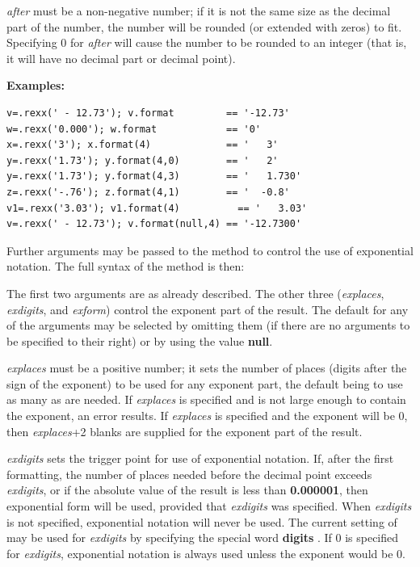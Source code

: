 \emph{after} must be a non-negative number; if it is not the same
size as the decimal part of the number, the number will be rounded (or
extended with zeros) to fit.  Specifying 0 for \emph{after} will
cause the number to be rounded to an integer (that is, it will have no
decimal part or decimal point).
 
\textbf{Examples:}
\begin{lstlisting}
v=.rexx(' - 12.73'); v.format         == '-12.73'
w=.rexx('0.000'); w.format            == '0'
x=.rexx('3'); x.format(4)             == '   3'
y=.rexx('1.73'); y.format(4,0)        == '   2'
y=.rexx('1.73'); y.format(4,3)        == '   1.730'
z=.rexx('-.76'); z.format(4,1)        == '  -0.8'
v1=.rexx('3.03'); v1.format(4)          == '   3.03'
v=.rexx(' - 12.73'); v.format(null,4) == '-12.7300'
\end{lstlisting}
 
Further arguments may be passed to the  method to control
the use of exponential notation.
The full syntax of the method is then:
 
 The first two arguments are as already described.  The other three
(\emph{explaces}, \emph{exdigits}, and \emph{exform})
control the exponent part of the result.  The default for any of the
arguments may be selected by omitting them (if there are no arguments to
be specified to their right) or by using the value \textbf{null}.
 
\emph{explaces} must be a positive number; it sets the number of
places (digits after the sign of the exponent) to be used for any
exponent part, the default being to use as many as are needed.
If \emph{explaces} is specified and is not large enough to contain
the exponent, an error results.
If \emph{explaces} is specified and the exponent will be 0,
then \emph{explaces}+2 blanks are supplied for the exponent
part of the result.
 
\emph{exdigits} sets the trigger point for use of exponential
notation.
If, after the first formatting, the number of places needed before the
decimal point exceeds \emph{exdigits}, or if the absolute value of
the result is less than \textbf{0.000001}, then exponential form will
be used, provided that \emph{exdigits} was specified.
When \emph{exdigits} is not specified, exponential notation
will never be used.
The current setting of  may be used for
\emph{exdigits} by specifying the special word
 \textbf{digits} %
 .
If 0 is specified for \emph{exdigits}, exponential
notation is always used unless the exponent would be 0.
 
